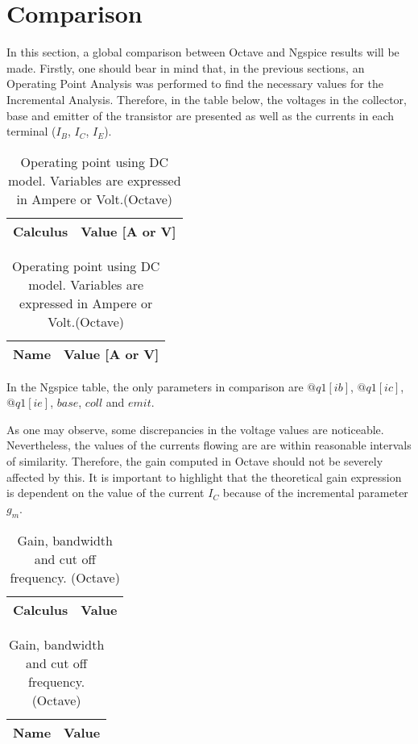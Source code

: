 \section{Comparison}
\label{section:comparison}

\par In this section, a global comparison between Octave and Ngspice results will be made. Firstly, one should bear in mind that, in the previous sections, an Operating Point Analysis was performed to find the necessary values for the Incremental Analysis. Therefore, in the table below, the voltages in the collector, base and emitter of the transistor are presented as well as the currents in each terminal ($I_{B}$, $I_{C}$, $I_{E}$).

\begin{table}[ht]
\parbox{.45\linewidth}{
  \centering
  \begin{tabular}{|l|r|}
    \hline    
    {\bf Calculus} & {\bf Value [A or V]} \\ \hline
    
  \end{tabular}
  \caption{Operating point using DC model. Variables are expressed in Ampere or Volt. (Ngspice)}} 
\parbox{.45\linewidth}{
 \centering
  \begin{tabular}{|l|r|}
    \hline    
    {\bf Name} & {\bf Value [A or V]} \\ \hline
    
  \end{tabular}
  \caption{Operating point using DC model. Variables are expressed in Ampere or Volt.(Octave)}}
\end{table}

In the Ngspice table, the only parameters in comparison are $@q1[ib]$, $@q1[ic]$, $@q1[ie]$, $base$, $coll$ and $emit$.
\par As one may observe, some discrepancies in the voltage values are noticeable. Nevertheless, the values of the currents flowing are are within reasonable intervals of similarity. Therefore, the gain computed in Octave should not be severely affected by this. It is important to highlight that the theoretical gain expression is dependent on the value of the current $I_{C}$ because of the incremental parameter $g_{m}$. 

 \begin{table}[ht]
\parbox{.45\linewidth}{
  \centering
  \begin{tabular}{|l|r|}
    \hline    
    {\bf Calculus} & {\bf Value} \\ \hline
    
  \end{tabular}
  \caption{Gain, bandwidth and cut off frequency. (Ngspice)}} 
\parbox{.45\linewidth}{
 \centering
  \begin{tabular}{|l|r|}
    \hline    
    {\bf Name} & {\bf Value} \\ \hline
    
  \end{tabular}
  \caption{Gain, bandwidth and cut off frequency. (Octave)}}
\end{table}

